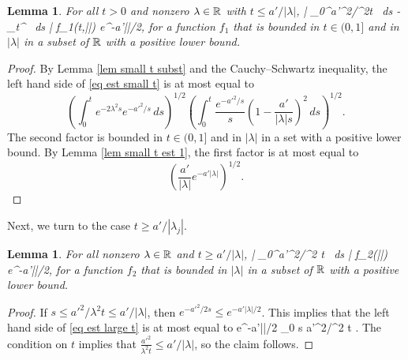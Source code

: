 \documentclass[11pt]{article}
\theoremstyle{plain}
\newtheorem{lemma}[theorem]{Lemma}
\theoremstyle{definition}
\theoremstyle{remark}
\numberwithin{equation}{section}
\begin{document}
\begin{lemma}\label{lem est small t 3}
For all $t> 0$ and nonzero $\lambda \in \mathbb{R}$ with $t \leq a'/|\lambda|$,
\left| \int_0^{a'^2/\lambda^2t}
 \, ds -
\int_t^{\infty}
 \, ds  \right|
 \leq
f_1(t,|\lambda|) e^{-a'|\lambda|/2},
\eeq
for a function $f_1$ that is bounded in $t \in (0,1]$ and in $|\lambda|$ in a subset of $\mathbb{R}$ with a positive lower bound.
\end{lemma}
\begin{proof}
By Lemma \ref{lem small t subst} and the Cauchy--Schwartz inequality, the left hand side of  \eqref{eq est small t} is at most equal to
\[
\left( \int_0^t e^{-2\lambda^2 s}  e^{-a'^2 /s}\, ds\right)^{1/2}
\left( \int_0^t  \frac{e^{-a'^2/s}}{s}
 \left(1-\frac{a'}{|\lambda| s} \right)^2
 \, ds\right)^{1/2}.
\]
The second factor is  bounded in $t \in (0,1]$ and in $|\lambda|$ in a set with a positive lower bound. By Lemma \ref{lem small t est 1}, the first factor is at most equal to
\[
\left( \frac{a'}{|\lambda|} e^{-a'|\lambda|} \right)^{1/2}.
\]
\end{proof}

Next, we turn to the case $t \geq a'/|\lambda_j|$.
\begin{lemma}\label{lem est large t 3}
For all nonzero $\lambda \in \mathbb{R}$ and $t \geq a'/|\lambda|$,
\left| \int_0^{a'^2/\lambda^2 t}
 \, ds
\right| \leq f_2(|\lambda|) e^{-a'|\lambda|/2},
\eeq
for a function $f_2$ that is bounded in $|\lambda|$ in a subset of $\mathbb{R}$ with a positive lower bound.
\end{lemma}
\begin{proof}
If $s \leq a'^2/\lambda^2 t \leq a'/|\lambda|$, then $e^{-a'^2/2s} \leq e^{-a'|\lambda|/2}$. This implies that the left hand side of \eqref{eq est large t} is at most equal to
 e^{-a'|\lambda|/2} \max_{0 \leq s \leq a'^2/\lambda^2 t} .
\eeq
The condition on $t$ implies that $\frac{a'^2}{\lambda^2 t} \leq a'/|\lambda|$, so the claim follows.
\end{proof}
\end{document}
